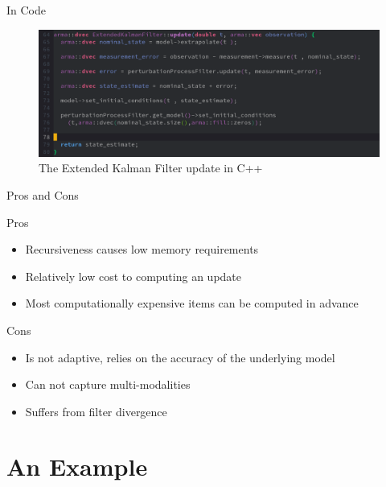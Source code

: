 \documentclass{beamer}
\begin{document}
\begin{frame}{In Code}

\begin{figure}
  \includegraphics[scale=0.3]{ekf_implementation.png}
  \caption{The Extended Kalman Filter update in C++}

\end{figure}
\end{frame}

\begin{frame}{Pros and Cons}
  \begin{box}{Pros}
    \begin{itemize}
     
    \item Recursiveness causes low memory requirements
     
    \item Relatively low cost to computing an update
     
    \item Most computationally expensive items can be computed in advance

    \end{itemize}
  \end{box}

  \begin{box}{Cons}
    \begin{itemize}

    \item  Is not adaptive, relies on the accuracy of the underlying model

    \item  Can not capture multi-modalities

    \item  Suffers from filter divergence

    \end{itemize}

  \end{box}
\end{frame}
  

\section{An Example}
\end{document}
